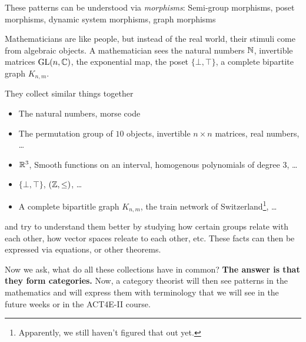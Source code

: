 \par{These patterns can be understood via \emph{morphisms}: Semi-group morphisms, poset morphisms, dynamic system morphisms, graph morphisms}

\vspace{1\baselineskip} 

Mathematicians are like people, but instead of the real world, their stimuli come from algebraic objects.
A mathematician sees the natural numbers $\mathbb{N}$, invertible matrices $\operatorname{GL}(n,\mathbb{C})$, the exponential map, the poset $\{\bot,\top\}$, a complete bipartite graph $K_{n,m}$.

They collect similar things together
\begin{itemize}
  \item The natural numbers, morse code
  \item The permutation group of $10$ objects, invertible $n \times n$ matrices, real numbers, \ldots
  \item $\mathbb{R}^{3}$, Smooth functions on an interval, homogenous polynomials of degree $3$, \ldots
  \item $\{\bot,\top\}$,  $(\mathbb{Z},\leq)$, \ldots
  \item A complete bipartitle graph $K_{n,m}$, the train network of Switzerland\footnote{Apparently, we still haven't figured that out yet.}, \ldots
\end{itemize}
and try to understand them better by studying how certain groups relate with each other, how vector spaces releate to each other, etc. These facts can then be expressed via equations, or other theorems.

Now we ask, what do all these collections have in common? \textbf{The answer is that they form categories.}
Now, a category theorist will then see patterns in the mathematics and will express them with terminology that we will see in the future weeks or in the ACT4E-II course.


